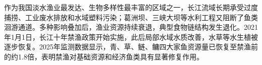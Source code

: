 作为我国淡水渔业最发达、生物多样性最丰富的区域之一，长江流域长期承受过度捕捞、工业废水排放和水域塑料污染；葛洲坝、三峡大坝等水利工程又阻断了鱼类洄游通道。多种影响叠加后，渔业资源持续衰退，典型食物链结构发生退化。2021年1月1日，长江十年禁渔政策开始实施，此后局部水域水质改善，水草等水生植被逐步恢复。2025年监测数据显示，青、草、鲢、鳙四大家鱼资源量已恢复至禁渔前的约1.8倍，表明禁渔对基础资源和经济鱼类具有显著修复作用。
